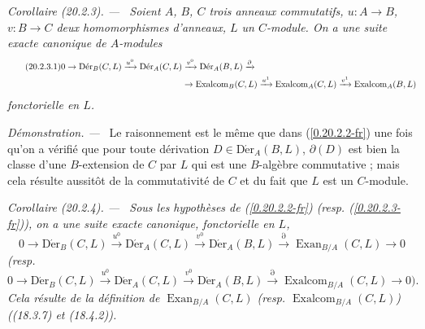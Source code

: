 \documentclass[10pt,oneside]{book}
\makeatletter
\newcommand{\sref}[1]{(\ref{#1})}
\newcommand{\setmanualcurrentlabel}[1]{\def\@currentlabel{#1}}
\newcommand{\oldpage}[2][]{%
  \setcounter{footnote}{0}%
  \marginpar{\scriptsize\textbf{#1}~|~#2}\ignorespaces}
\newenvironment{corollary}[1][]{%
  \setmanualcurrentlabel{#1}\par\medskip\noindent\itshape Corollaire (#1). ---\ }{\par}
\newenvironment{proof}{%
  \par\medskip\noindent\textit{Démonstration. ---\ }}{\par}
\makeatother
\begin{document}
\oldpage[0\textsubscript{IV-1}]{121}
\begin{corollary}[20.2.3]
\label{0.20.2.3-fr}
Soient $A$, $B$, $C$ trois anneaux commutatifs, $u:A\to B$, $v:B\to C$
deux homomorphismes d'anneaux, $L$ un $C$-module. On a une suite exacte
canonique de $A$-modules
\begin{align}
\tag{20.2.3.1}
\label{0.20.2.3.1-fr}
  0\to\operatorname{D\acute{e}r}_B(C,L)\xrightarrow{u^0}
  \operatorname{D\acute{e}r}_A(C,L)&\xrightarrow{v^0}
  \operatorname{D\acute{e}r}_A(B,L)\xrightarrow{\partial} \\
  &\to\operatorname{Exalcom}_B(C,L)\xrightarrow{u^1}
  \operatorname{Exalcom}_A(C,L)\xrightarrow{v^1}
  \operatorname{Exalcom}_A(B,L) \notag
\end{align}
fonctorielle en $L$.
\end{corollary}

\begin{proof}
Le raisonnement est le même que dans \sref{0.20.2.2-fr} une fois qu'on a
vérifié que pour toute dérivation $D\in\operatorname{D\acute{e}r}_A(B,L)$,
$\partial(D)$ est bien la classe d'une $B$-extension de $C$ par $L$ qui est
une $B$-algèbre commutative ; mais cela résulte aussitôt de la commutativité
de $C$ et du fait que $L$ est un $C$-module.
\end{proof}

\begin{corollary}[20.2.4]
\label{0.20.2.4-fr}
Sous les hypothèses de \sref{0.20.2.2-fr} (resp.
\sref{0.20.2.3-fr}), on a une suite exacte canonique, fonctorielle en $L$,
\begin{equation}
\tag{20.2.4.1}
\label{0.20.2.4.1-fr}
  0\to\operatorname{D\acute{e}r}_B(C,L)\xrightarrow{u^0}
  \operatorname{D\acute{e}r}_A(C,L)\xrightarrow{v^0}
  \operatorname{D\acute{e}r}_A(B,L)\xrightarrow{\partial}
  \operatorname{Exan}_{B/A}(C,L)\to0
\end{equation}
(resp.
\begin{equation}
\tag{20.2.4.2}
\label{0.20.2.4.2-fr}
  0\to\operatorname{D\acute{e}r}_B(C,L)\xrightarrow{u^0}
  \operatorname{D\acute{e}r}_A(C,L)\xrightarrow{v^0}
  \operatorname{D\acute{e}r}_A(B,L)\xrightarrow{\partial}
  \operatorname{Exalcom}_{B/A}(C,L)\to0\text{).}
\end{equation}
Cela résulte de la définition de $\operatorname{Exan}_{B/A}(C,L)$ (resp.
$\operatorname{Exalcom}_{B/A}(C,L)$) ((18.3.7) et (18.4.2)).
\end{corollary}
\end{document}
